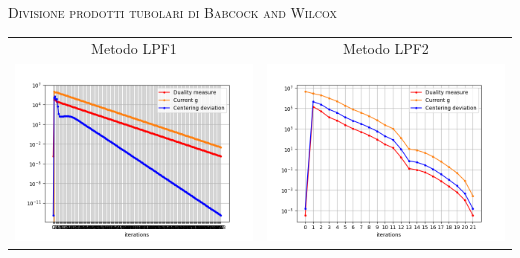 \begin{frame}{\textsc{\LARGE \textcolor{iris}{Divisione prodotti tubolari di Babcock and Wilcox}}}
	\centering
	\begin{tabular}{c@{}c}
		\small{Metodo LPF1} & \small{Metodo LPF2} \\
		\includegraphics[scale = 0.33]{for_LPF1}
		&\includegraphics[scale = 0.33]{tub_LPF2}\\ 
	\end{tabular}
\end{frame}

